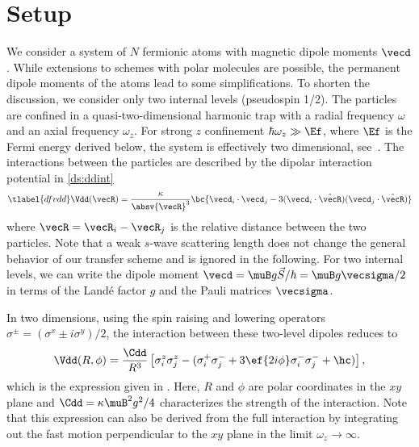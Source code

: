 \section{Setup}

We consider a system of $N$ fermionic atoms with magnetic dipole moments $\vecd$. While extensions to schemes with polar molecules are possible, the permanent dipole moments of the atoms lead to some simplifications.
To shorten the discussion, we consider only two internal levels (pseudospin 1/2). The particles are confined in a quasi-two-dimensional harmonic trap with a radial frequency $\omega$ and an axial frequency $\omega_z$. For strong $z$ confinement $\hbar\omega_z \gg \Ef$, where $\Ef$ is the Fermi energy derived below, the system is effectively two dimensional, see~.
The interactions between the particles are described by the dipolar interaction potential in \cref{ds:ddint}
\begin{align} \tlabel{dfvdd}
\Vdd(\vecR) = \frac{\kappa}{\absv{\vecR}^3} \bc{ \vecd_i \cdot \vecd_j -3 (\vecd_i \cdot \hat{\vecR})(\vecd_j \cdot \hat{\vecR}) }
\end{align}
where $\vecR=\vecR_i-\vecR_j$ is the relative distance between the two particles.
Note that a weak $s$-wave scattering length does not change the general behavior of our transfer scheme and is ignored in the following.
For two internal levels, we can write the
dipole moment $\vecd =  \muB g \vec{S} / \hbar = \muB g \vecsigma/2$ in terms of the Land\'e factor $g$ and the Pauli matrices $\vecsigma$.

In two dimensions, using the spin raising and lowering operators $\sigma^{\pm} = (\sigma^x \pm i \sigma^y)/2$, the interaction between these two-level dipoles reduces to
\begin{align}
\Vdd(R,\phi) =  \frac{\Cdd}{R^3} \left[
\sigma^z_i \sigma^z_j - (\sigma^+_i \sigma^-_j +3 \ef{2i\phi} \sigma^-_i \sigma^-_j  +\hc)
\right],
\end{align}
which is the expression given in . Here, $R$ and $\phi$ are polar coordinates in the $xy$ plane and $\Cdd = \kappa \muB^2 g^2 / 4$ characterizes the strength of the interaction.
Note that this expression can also be derived from the full interaction  by integrating out the fast motion perpendicular to the $xy$ plane in the limit $\omega_z\rightarrow\infty$.

